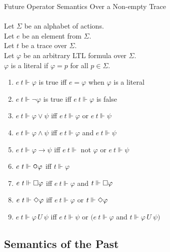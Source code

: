 \begin{definition}Future Operator Semantics Over a Non-empty Trace\\
\label{def:FutureNon-emptyTraceSemantics}
\\
Let $\Sigma$ be an alphabet of actions.\\
Let $e$ be an element from $\Sigma$.\\
Let $t$ be a trace over $\Sigma$.\\
Let $\varphi$ be an arbitrary LTL formula over $\Sigma$.\\
$\varphi$ is a literal if $\varphi = p$ for all $p \in \Sigma$.

\begin{enumerate}[start = 10]
\item $e\ t  \Vdash \varphi$ is true iff $e = \varphi$ when $\varphi$ is a literal
\item $e\ t  \Vdash \neg\varphi$ is true iff $e\ t \Vdash \varphi$ is false
\item $e\ t  \Vdash \varphi \lor \psi$ iff $e\ t \Vdash \varphi$ or $e\ t \Vdash \psi$
\item $e\ t  \Vdash \varphi \land \psi$ iff $e\ t \Vdash \varphi$ and $e\ t \Vdash \psi$
\item $e\ t  \Vdash \varphi \rightarrow \psi$ iff $e\ t \Vdash $ not $\varphi$ or $e\ t \Vdash \psi$
\item $e\ t  \Vdash \LTLnext\varphi$ iff $t \Vdash \varphi$
\item $e\ t  \Vdash \square\varphi$ iff $e\ t \Vdash \varphi$ and $t \Vdash \square\varphi$
\item $e\ t  \Vdash \Diamond\varphi$ iff $e\ t \Vdash \varphi$ or $t \Vdash \Diamond\varphi$
\item $e\ t  \Vdash \varphi \,U\ \psi$ iff $e\ t \Vdash \psi$ or $(e\ t \Vdash \varphi$ and $t \Vdash \varphi \,U\ \psi)$
\end{enumerate}
\end{definition}

\subsection{Semantics of the Past}
\label{sec:LTLPastSemantics}

